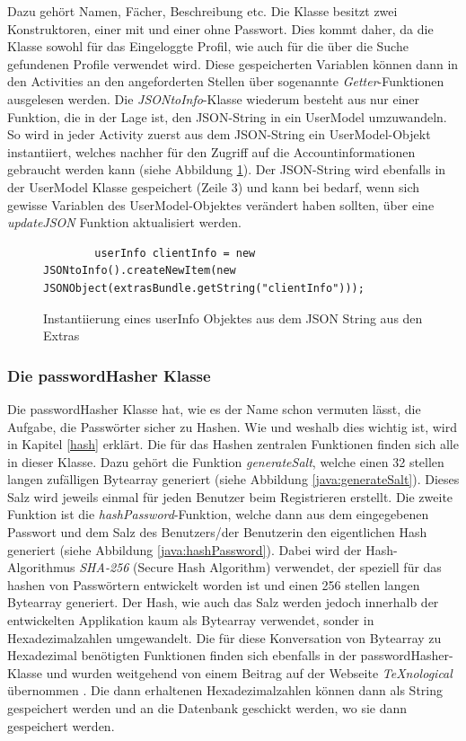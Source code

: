 \documentclass[a4paper,11pt]{report}
\begin{document}
				Dazu gehört Namen, Fächer, Beschreibung etc. Die Klasse besitzt zwei Konstruktoren, einer mit und einer ohne Passwort. Dies kommt daher, da die Klasse sowohl für das Eingeloggte Profil, wie auch für die über die Suche gefundenen Profile verwendet wird. Diese gespeicherten Variablen können dann in den Activities an den angeforderten Stellen über sogenannte \emph{Getter}-Funktionen ausgelesen werden. Die \emph{JSONtoInfo}-Klasse wiederum besteht aus nur einer Funktion, die in der Lage ist, den JSON-String in ein UserModel umzuwandeln. So wird in jeder Activity zuerst aus dem JSON-String ein UserModel-Objekt instantiiert, welches nachher für den Zugriff auf die Accountinformationen gebraucht werden kann (siehe Abbildung \ref{java:instanzUserInfo}). Der JSON-String wird ebenfalls in der UserModel Klasse gespeichert (Zeile 3) und kann bei bedarf, wenn sich gewisse Variablen des UserModel-Objektes verändert haben sollten, über eine \emph{updateJSON} Funktion aktualisiert werden.
				
\begin{figure}
	\begin{center}
		\begin{verbatim}
		userInfo clientInfo = new JSONtoInfo().createNewItem(new JSONObject(extrasBundle.getString("clientInfo")));
		\end{verbatim}
		\caption{Instantiierung eines userInfo Objektes aus dem JSON String aus den Extras}\label{java:instanzUserInfo}
	\end{center}
\end{figure}				
				\subsubsection{Die passwordHasher Klasse}\label{passwordHasher}
				Die passwordHasher Klasse hat, wie es der Name schon vermuten lässt, die Aufgabe, die Passwörter sicher zu Hashen. Wie und weshalb dies wichtig ist, wird in Kapitel \ref{hash} erklärt. Die für das Hashen zentralen Funktionen finden sich alle in dieser Klasse. Dazu gehört die Funktion \emph{generateSalt}, welche einen 32 stellen langen zufälligen Bytearray generiert (siehe Abbildung \ref{java:generateSalt}). Dieses Salz wird jeweils einmal für jeden Benutzer beim Registrieren erstellt. Die zweite Funktion ist die \emph{hashPassword}-Funktion, welche dann aus dem eingegebenen Passwort und dem Salz des Benutzers/der Benutzerin den eigentlichen Hash generiert (siehe Abbildung \ref{java:hashPassword}). Dabei wird der Hash-Algorithmus \emph{SHA-256} (Secure Hash Algorithm) verwendet, der speziell für das hashen von Passwörtern entwickelt worden ist und einen 256 stellen langen Bytearray generiert. Der Hash, wie auch das Salz werden jedoch innerhalb der entwickelten Applikation kaum als Bytearray verwendet, sonder in Hexadezimalzahlen umgewandelt. Die für diese Konversation von Bytearray zu Hexadezimal benötigten Funktionen finden sich ebenfalls in der passwordHasher-Klasse und wurden weitgehend von einem Beitrag auf der Webseite \emph{TeXnological} übernommen \cite{TeXnological}. Die dann erhaltenen Hexadezimalzahlen können dann als String gespeichert werden und an die Datenbank geschickt werden, wo sie dann gespeichert werden.
				
\end{document}
